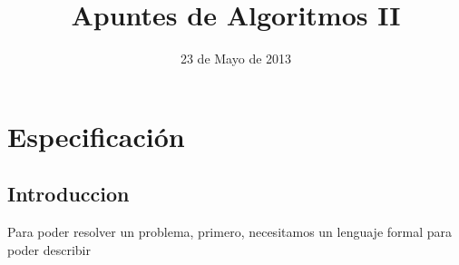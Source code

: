 \documentclass[a4paper,10pt]{article}
\title{ Apuntes de Algoritmos II }
\date{23 de Mayo de 2013}
\begin{document}
\maketitle
\tableofcontents 
\clearpage
\section{Especificación}
\subsection{Introduccion}
Para poder resolver un problema, primero, necesitamos un lenguaje formal para poder describir  
\end{document}
